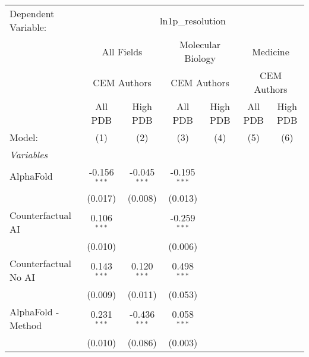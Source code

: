 \begingroup
\centering
\begin{tabular}{lcccccc}
   \tabularnewline \midrule \midrule
   Dependent Variable: & \multicolumn{6}{c}{ln1p\_resolution}\\
 & \multicolumn{2}{c}{All Fields} & \multicolumn{2}{c}{Molecular Biology} & \multicolumn{2}{c}{Medicine} \\
\cmidrule(lr){2-3} \cmidrule(lr){4-5} \cmidrule(lr){6-7}
 & \multicolumn{2}{c}{CEM Authors} & \multicolumn{2}{c}{CEM Authors} & \multicolumn{2}{c}{CEM Authors} \\
\cmidrule(lr){2-3} \cmidrule(lr){4-5} \cmidrule(lr){6-7}
 & \multicolumn{1}{c}{All PDB} & \multicolumn{1}{c}{High PDB} & \multicolumn{1}{c}{All PDB} & \multicolumn{1}{c}{High PDB} & \multicolumn{1}{c}{All PDB} & \multicolumn{1}{c}{High PDB} \\
\cmidrule(lr){2-2} \cmidrule(lr){3-3} \cmidrule(lr){4-4} \cmidrule(lr){5-5} \cmidrule(lr){6-6} \cmidrule(lr){7-7}
   Model:                                                     & (1)            & (2)            & (3)            & (4) & (5) & (6)\\  
   \midrule
   \emph{Variables}\\
   AlphaFold                                                  & -0.156$^{***}$ & -0.045$^{***}$ & -0.195$^{***}$ &     &     &   \\   
                                                              & (0.017)        & (0.008)        & (0.013)        &     &     &   \\   
   Counterfactual AI                                          & 0.106$^{***}$  &                & -0.259$^{***}$ &     &     &   \\   
                                                              & (0.010)        &                & (0.006)        &     &     &   \\   
   Counterfactual No AI                                       & 0.143$^{***}$  & 0.120$^{***}$  & 0.498$^{***}$  &     &     &   \\   
                                                              & (0.009)        & (0.011)        & (0.053)        &     &     &   \\   
   AlphaFold - Method                                         & 0.231$^{***}$  & -0.436$^{***}$ & 0.058$^{***}$  &     &     &   \\   
                                                              & (0.010)        & (0.086)        & (0.003)        &     &     &   \\   

\end{tabular}
